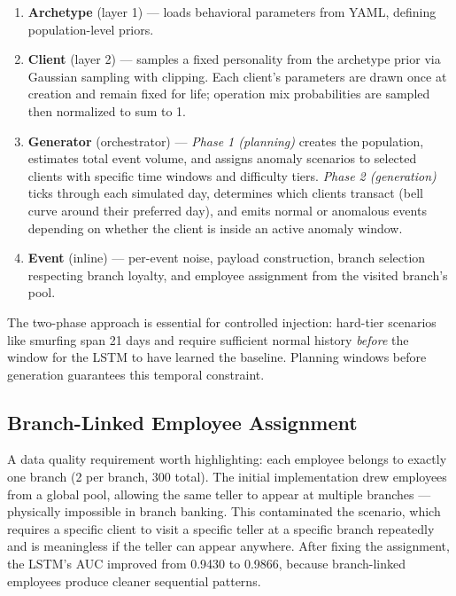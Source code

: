 \begin{enumerate}
  \item \textbf{Archetype} (layer 1) --- loads behavioral parameters from YAML, defining population-level priors.
  \item \textbf{Client} (layer 2) --- samples a fixed personality from the archetype prior via Gaussian sampling with clipping. Each client's parameters are drawn once at creation and remain fixed for life; operation mix probabilities are sampled then normalized to sum to 1.
  \item \textbf{Generator} (orchestrator) --- \emph{Phase 1 (planning)} creates the population, estimates total event volume, and assigns anomaly scenarios to selected clients with specific time windows and difficulty tiers. \emph{Phase 2 (generation)} ticks through each simulated day, determines which clients transact (bell curve around their preferred day), and emits normal or anomalous events depending on whether the client is inside an active anomaly window.
  \item \textbf{Event} (inline) --- per-event noise, payload construction, branch selection respecting branch loyalty, and employee assignment from the visited branch's pool.
\end{enumerate}

The two-phase approach is essential for controlled injection: hard-tier scenarios like smurfing span 21 days and require sufficient normal history \emph{before} the window for the LSTM to have learned the baseline. Planning windows before generation guarantees this temporal constraint.

\subsection{Branch-Linked Employee Assignment}

A data quality requirement worth highlighting: each employee belongs to exactly one branch (2 per branch, 300 total). The initial implementation drew employees from a global pool, allowing the same teller to appear at multiple branches --- physically impossible in branch banking. This contaminated the  scenario, which requires a specific client to visit a specific teller at a specific branch repeatedly and is meaningless if the teller can appear anywhere. After fixing the assignment, the LSTM's AUC improved from 0.9430 to 0.9866, because branch-linked employees produce cleaner sequential patterns.

